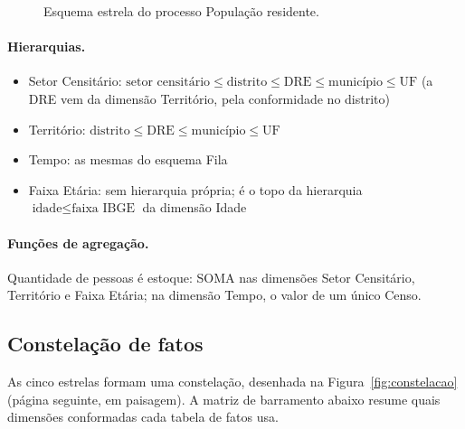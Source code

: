 \documentclass[11pt,a4paper]{article}
\newcommand{\hier}[1]{$#1$}
\begin{document}
\begin{figure}[H]
\centering
\resizebox{0.9\linewidth}{!}{}
\caption{Esquema estrela do processo População residente.}
\end{figure}

\paragraph{Hierarquias.}
\begin{itemize}
\item Setor Censitário: \hier{\text{setor censitário} \leq \text{distrito} \leq \text{DRE} \leq \text{município} \leq \text{UF}} (a DRE vem da dimensão Território, pela conformidade no distrito)
\item Território: \hier{\text{distrito} \leq \text{DRE} \leq \text{município} \leq \text{UF}}
\item Tempo: as mesmas do esquema Fila
\item Faixa Etária: sem hierarquia própria; é o topo da hierarquia \hier{\text{idade} \leq \text{faixa IBGE}} da dimensão Idade
\end{itemize}

\paragraph{Funções de agregação.} Quantidade de pessoas é estoque: SOMA nas dimensões Setor Censitário, Território e Faixa Etária; na dimensão Tempo, o valor de um único Censo.

\subsection{Constelação de fatos}

As cinco estrelas formam uma constelação, desenhada na Figura~\ref{fig:constelacao} (página seguinte, em paisagem). A matriz de barramento abaixo resume quais dimensões conformadas cada tabela de fatos usa.
\end{document}
